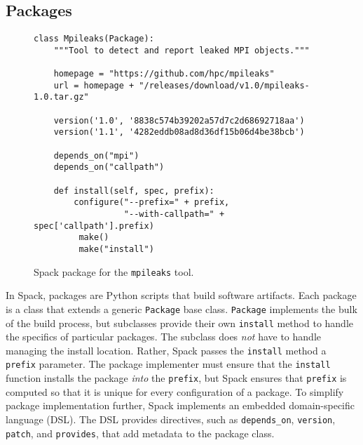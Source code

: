 
\subsection{Packages}\label{sec:packages}

\begin{figure}
\begin{verbatim}
class Mpileaks(Package):
    """Tool to detect and report leaked MPI objects."""

    homepage = "https://github.com/hpc/mpileaks"
    url = homepage + "/releases/download/v1.0/mpileaks-1.0.tar.gz"

    version('1.0', '8838c574b39202a57d7c2d68692718aa')
    version('1.1', '4282eddb08ad8d36df15b06d4be38bcb')

    depends_on("mpi")
    depends_on("callpath")

    def install(self, spec, prefix):
        configure("--prefix=" + prefix,
                  "--with-callpath=" + spec['callpath'].prefix)
         make()
         make("install")
\end{verbatim}
	\caption{
		Spack package for the {\tt mpileaks} tool.
		\label{fig:mpileaks}
	}
\end{figure}

In Spack, packages are Python scripts that build software artifacts.
Each package is a class that extends a generic {\tt Package}
base class.  {\tt Package} implements the bulk of the build process, but
subclasses provide their own {\tt install} method to handle the
specifics of particular packages. The subclass does {\it not} have to
handle managing the install location.  Rather, Spack passes the {\tt install}
method a {\tt prefix} parameter.  The package implementer must ensure that
the {\tt install} function installs the package {\it into} the {\tt prefix},
but Spack ensures that {\tt prefix} is computed so that it is
unique for every configuration of a package.  To simplify package 
implementation further, Spack implements an embedded domain-specific
language (DSL).
The DSL provides directives, such as {\tt depends\_on},
{\tt version}, {\tt patch}, and {\tt provides}, that add metadata
to the package class.

